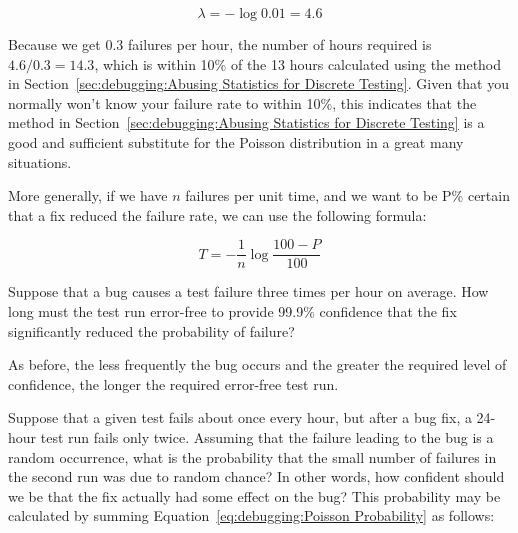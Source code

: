 \begin{equation}
	\lambda = - \log 0.01 = 4.6
\end{equation}

Because we get $0.3$ failures per hour, the number of hours required
is $4.6/0.3 = 14.3$, which is within 10\% of the 13 hours
calculated using the method in
Section~\ref{sec:debugging:Abusing Statistics for Discrete Testing}.
Given that you normally won't know your failure rate to within 10\%,
this indicates that the method in
Section~\ref{sec:debugging:Abusing Statistics for Discrete Testing}
is a good and sufficient substitute for the Poisson distribution in
a great many situations.

More generally, if we have $n$ failures per unit time, and we want to
be P\% certain that a fix reduced the failure rate, we can use the
following formula:

\begin{equation}
	T = - \frac{1}{n} \log \frac{100 - P}{100}
\label{eq:debugging:Error-Free Test Duration}
\end{equation}

\QuickQuiz{}
	Suppose that a bug causes a test failure three times per hour
	on average.
	How long must the test run error-free to provide 99.9\%
	confidence that the fix significantly reduced the probability
	of failure?
 \QuickQuizEnd

As before, the less frequently the bug occurs and the greater the
required level of confidence, the longer the required error-free test run.

Suppose that a given test fails about once every hour, but after a bug
fix, a 24-hour test run fails only twice.
Assuming that the failure leading to the bug is a random occurrence,
what is the probability that the small number of
failures in the second run was due to random chance?
In other words, how confident should we be that the fix actually
had some effect on the bug?
This probability may be calculated by summing
Equation~\ref{eq:debugging:Poisson Probability} as follows:

